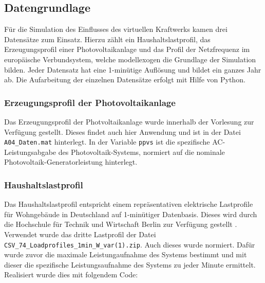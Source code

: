 
\subsection{Datengrundlage}

Für die Simulation des Einflusses des virtuellen Kraftwerks kamen drei Datensätze zum Einsatz. Hierzu zählt ein Haushaltslastprofil, das Erzeugungsprofil einer Photovoltaikanlage und das Profil der Netzfrequenz im europäische Verbundsystem, welche modellexogen die Grundlage der Simulation bilden. Jeder Datensatz hat eine 1-minütige Auflösung und bildet ein ganzes Jahr ab. Die Aufarbeitung der einzelnen Datensätze erfolgt mit Hilfe von Python.

\subsubsection{Erzeugungsprofil der Photovoltaikanlage}

Das Erzeugungsprofil der Photvoltaikanlage wurde innerhalb der Vorlesung zur Verfügung gestellt. Dieses findet auch hier Anwendung und ist in der Datei \texttt{A04\_Daten.mat} hinterlegt. In der Variable \texttt{ppvs} ist die spezifische AC-Leistungsabgabe des Photovoltaik-Systems, normiert auf die nominale Photovoltaik-Generatorleistung hinterlegt.

\subsubsection{Haushaltslastprofil}

Das Haushaltslastprofil entspricht einem repräsentativen elektrische Lastprofile für Wohngebäude in Deutschland auf 1-minütiger Datenbasis. Dieses wird durch die Hochschule für Technik und Wirtschaft Berlin zur Verfügung gestellt \parencite{htwLast18}.\\
Verwendet wurde das dritte Lastprofil der Datei \texttt{CSV\_74\_Loadprofiles\_1min\_W\_var(1).zip}. Auch dieses wurde normiert. Dafür wurde zuvor die maximale Leistungaufnahme des Systems bestimmt und mit dieser die spezifische Leistungsaufnahme des Systems zu jeder Minute ermittelt.\medskip\\
Realisiert wurde dies mit folgendem Code:

